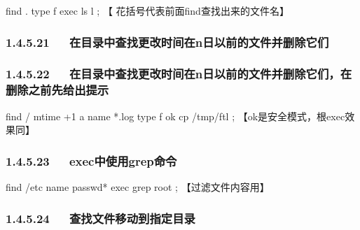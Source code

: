 \documentclass[letterpaper,12pt,english]{sphinxmanual}
\begin{document}
\begin{sphinxVerbatim}[commandchars=\\\{\}]
find . \PYGZhy{}type f \PYGZhy{}exec ls \PYGZhy{}l \PYGZob{}\PYGZcb{} \PYGZbs{}; 【\PYGZob{}\PYGZcb{}   花括号代表前面find查找出来的文件名】
\end{sphinxVerbatim}


\subsubsection{1.4.5.21   在目录中查找更改时间在n日以前的文件并删除它们}
\label{\detokenize{001software/001install/linux:n}}
\begin{sphinxVerbatim}[commandchars=\\\{\}]
       \PYGZbs{}
\end{sphinxVerbatim}


\subsubsection{1.4.5.22   在目录中查找更改时间在n日以前的文件并删除它们，在删除之前先给出提示}
\label{\detokenize{001software/001install/linux:id19}}
\begin{sphinxVerbatim}[commandchars=\\\{\}]
find / \PYGZhy{}mtime +1 \PYGZhy{}a \PYGZhy{}name \PYGZdq{}*.log\PYGZdq{} \PYGZhy{}type f \PYGZhy{}ok cp \PYGZob{}\PYGZcb{} /tmp/ftl \PYGZbs{}; 【\PYGZhy{}ok是安全模式，根exec效果同】
\end{sphinxVerbatim}


\subsubsection{1.4.5.23   exec中使用grep命令}
\label{\detokenize{001software/001install/linux:execgrep}}
\begin{sphinxVerbatim}[commandchars=\\\{\}]
find /etc \PYGZhy{}name \PYGZdq{}passwd*\PYGZdq{} \PYGZhy{}exec grep \PYGZdq{}root\PYGZdq{} \PYGZob{}\PYGZcb{} \PYGZbs{}; 【过滤文件内容用】
\end{sphinxVerbatim}


\subsubsection{1.4.5.24   查找文件移动到指定目录}
\label{\detokenize{001software/001install/linux:id20}}
\begin{sphinxVerbatim}[commandchars=\\\{\}]
        \PYGZbs{}
\end{sphinxVerbatim}
\end{document}
